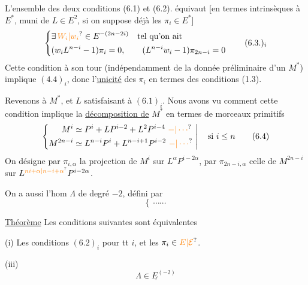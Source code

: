  L'ensemble des deux conditions (6.1) et (6.2). équivaut [en termes intrinsèques à $E^*$, muni de  $L\in E^2$, si on suppose déjà les $\pi_i\in E^*$]
\[
 \left\{\begin{aligned}
 &\exists\,\unsure{W_i|w_i}\in E^{-(2n-2i)}\quad\text{tel qu'on ait}\\
 &(w_i L^{n-i}-1)\pi_i=0,\qquad (L^{n-i}w_i-1)\pi_{2n-i}=0
 \end{aligned}\right.
 \tag*{$(6.3.)_i$}
\]
Cette condition à son tour (indépendamment de la donnée préliminaire d'un $M^*$) implique $(4.4)_i$,  donc   l'\uline{unicité} des $\pi_i$ en termes des conditions  (1.3).

Revenons à $M^*$, et $L$ satisfaisant à $(6.1)_i$. Nous avons vu comment  cette condition implique la \uline{décomposition de} $M^*$ en termes  de morceaux primitifs
\[
 \left\{\begin{aligned}
 M^i&\simeq P^i+LP^{i-2}+L^2P^{i-4}\ \unsure{-|\cdots}\\
 M^{2n-i}&\simeq L^{n-i}P^i+L^{n-i+1}P^{i-2}\ \unsure{-|\cdots}
 \end{aligned}\ \right|\quad\text{si }i\le n
 \tag*{(6.4)}
\]
On désigne par $\pi_{i,\alpha}$ la projection de $M^i$ sur $L^\alpha P^{i-2\alpha}$, par $\pi_{2n-i,\alpha}$ celle de $M^{2n-i}$ sur $L^{\unsure{ni+\alpha|n-i+\alpha}}P^{i-2\alpha}$.

On a aussi l'hom $\Lambda$ de degré $-2$, défini par
\[
 \left\{\ \cdots\cdots\ \right. \tag*{(6.5)}
\]

\uline{Théorème} Les conditions suivantes  sont équivalentes

(i) Les conditions  $(6.2)_i$ pour tt $i$, et les $\pi_i\in \unsure{E|\mathcal E}$.

  


(iii)   
\[
 \underline{\Lambda\in E^{(-2)}}\tag*{(6.6)}
\]

